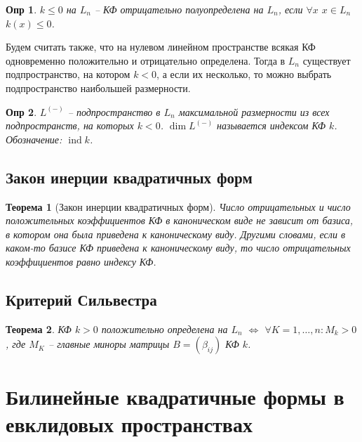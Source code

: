 \documentclass[a4paper,12pt]{article}
\DeclareMathOperator{\ind}{\mathop{ind}}
\newtheorem*{definition}{Опр}
\newtheorem{theorem}{Теорема}[section]
\begin{document}
\begin{definition}
	$k \le 0$ на $L_n$ -- КФ отрицательно полуопределена на $L_n$, если $\forall x$ $x \in L_n$  $k(x) \le 0$.
\end{definition}

Будем считать также, что на нулевом линейном пространстве всякая КФ одновременно положительно и отрицательно определена. Тогда в $L_n$ существует подпространство, на котором  $k < 0$, а если их несколько, то можно выбрать подпространство наибольшей размерности.

\begin{definition}
	$L^{(-)}$ -- подпространство в $L_n$ максимальной размерности из всех подпространств, на которых $k < 0$. $\dim L^{(-)}$ называется индексом КФ $k$. Обозначение: $\ind{k}$.
\end{definition}

\subsection{Закон инерции квадратичных форм}

\begin{theorem}[Закон инерции квадратичных форм]
	Число отрицательных и число положительных коэффициентов КФ в каноническом виде не зависит от базиса, в котором она была приведена к каноническому виду. Другими словами, если в каком-то базисе КФ приведена к каноническому виду, то число отрицательных коэффициентов равно индексу КФ.
\end{theorem}

\subsection{Критерий Сильвестра}

\begin{theorem}
	КФ $k > 0$ положительно определена на $L_n$ $\Leftrightarrow$ $\forall K = 1,\ldots,n: M_k > 0$, где $M_K$ -- главные миноры матрицы $B = (\beta_{ij})$ КФ $k$.
\end{theorem}

\section{Билинейные квадратичные формы в евклидовых пространствах}
\end{document}
